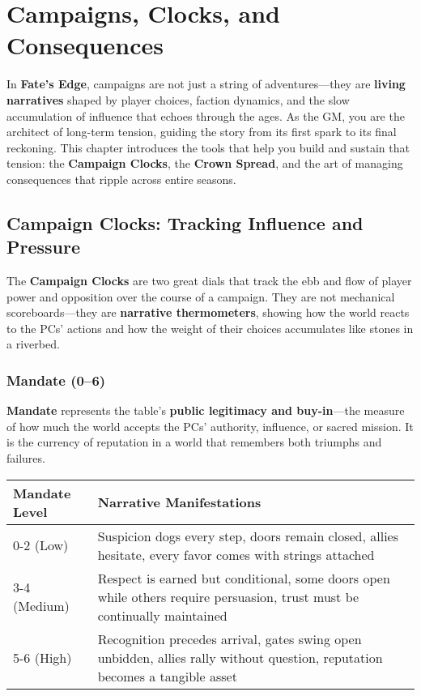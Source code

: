 \chapter{Campaigns, Clocks, and Consequences}

In \textbf{Fate's Edge}, campaigns are not just a string of adventures---they are \textbf{living narratives} shaped by player choices, faction dynamics, and the slow accumulation of influence that echoes through the ages. As the GM, you are the architect of long-term tension, guiding the story from its first spark to its final reckoning. This chapter introduces the tools that help you build and sustain that tension: the \textbf{Campaign Clocks}, the \textbf{Crown Spread}, and the art of managing consequences that ripple across entire seasons.

\section*{Campaign Clocks: Tracking Influence and Pressure}

The \textbf{Campaign Clocks} are two great dials that track the ebb and flow of player power and opposition over the course of a campaign. They are not mechanical scoreboards---they are \textbf{narrative thermometers}, showing how the world reacts to the PCs' actions and how the weight of their choices accumulates like stones in a riverbed.

\subsection*{Mandate (0--6)}

\textbf{Mandate} represents the table's \textbf{public legitimacy and buy-in}—the measure of how much the world accepts the PCs' authority, influence, or sacred mission. It is the currency of reputation in a world that remembers both triumphs and failures.

\begin{fatebox}
\begin{tabularx}{\textwidth}{lX}
\toprule
\textbf{Mandate Level} & \textbf{Narrative Manifestations} \\
\midrule
0-2 (Low) & Suspicion dogs every step, doors remain closed, allies hesitate, every favor comes with strings attached \\
3-4 (Medium) & Respect is earned but conditional, some doors open while others require persuasion, trust must be continually maintained \\
5-6 (High) & Recognition precedes arrival, gates swing open unbidden, allies rally without question, reputation becomes a tangible asset \\
\bottomrule
\end{tabularx}
\end{fatebox}

